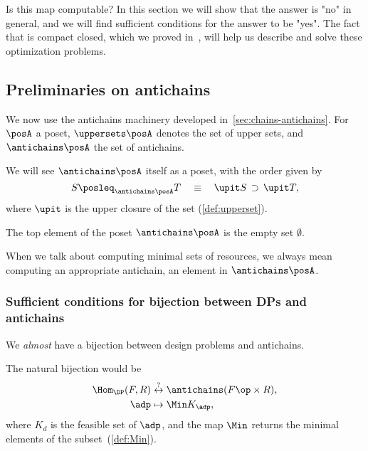 Is this map computable?
In this section we will show that the answer is "no" in general, and we will find sufficient conditions for the answer to be "yes".
The fact that \DP is compact closed, which we proved in~\XXX, will help us describe and solve these optimization problems.

\subsection{Preliminaries on antichains}

We now use the antichains machinery developed in~\cref{sec:chains-antichains}.
For $\posA$ a poset, $\uppersets \posA$ denotes the set of upper sets, and $\antichains \posA$ the set of antichains.


We will see $\antichains \posA$ itself as a poset, with the order given by
\begin{equation*}
    S \posleq_{\antichains \posA} T  \quad \equiv \quad\upit S\, \supset\,\upit T,
\end{equation*}
where $\upit$ is the upper closure of the set (\cref{def:upperset}).

The top element of the poset $\antichains\posA$ is the empty set $\emptyset$.

When we talk about computing minimal sets of resources, we always mean computing an appropriate antichain, \ie an element in $\antichains \posA$.

\subsubsection{Sufficient conditions for bijection between DPs and antichains}

We \emph{almost} have a bijection between design problems and antichains.

The natural bijection would be
\begin{equation}
    \begin{aligned}
        \Hom_\DP(F,R) & \overset{?
        }{\leftrightarrow} \antichains (F\op \times R), \\
        \adp          & \mapsto \Min K_\adp,
    \end{aligned}
\end{equation}
where $K_d$ is the feasible set of $\adp$,
and the map $\Min$ returns the minimal elements of the subset~(\cref{def:Min}).

